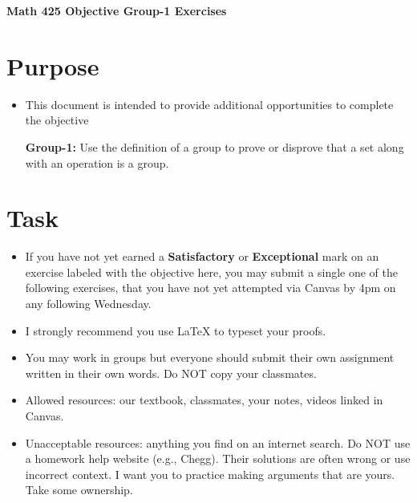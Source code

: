 \documentclass[12pt]{article}
\begin{document}
	\begin{center}
		{\Large \bf Math 425 Objective Group-1 Exercises}
	\end{center}
	\section*{Purpose}
	\begin{itemize}
		\item This document is intended to provide additional opportunities to complete the objective
		
		\textbf{Group-1:} Use the definition of a group to prove or disprove that a set along with an operation is a group.
	\end{itemize}
	\section*{Task}
	\begin{itemize}
		\item If you have not yet earned a \textbf{Satisfactory} or \textbf{Exceptional} mark on an exercise labeled with the objective here, you may submit a single one of the following exercises, that you have not yet attempted via Canvas by 4pm on any following Wednesday.
		\item I strongly recommend you use LaTeX to typeset your proofs.
		\item You may work in groups but everyone should submit their own assignment written in their own words.  Do NOT copy your classmates.
		\item Allowed resources: our textbook, classmates, your notes, videos linked in Canvas.
		\item Unacceptable resources: anything you find on an internet search. Do NOT use a homework help website (e.g., Chegg). Their solutions are often wrong or use incorrect context.  I want you to practice making arguments that are yours. Take some ownership.
	\end{itemize}
\end{document}
